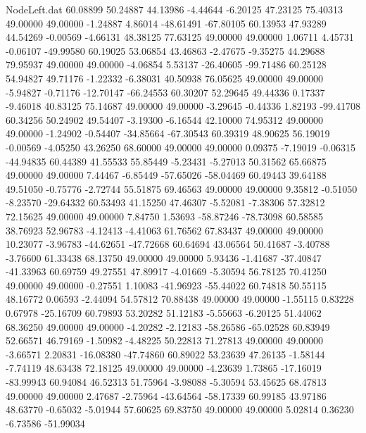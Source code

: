 \begin{filecontents}{NodeLeft.dat}
  60.08899   50.24887   44.13986    -4.44644   -6.20125   47.23125   75.40313   49.00000   49.00000   -1.24887    4.86014  -48.61491  -67.80105
  60.13953   47.93289   44.54269    -0.00569   -4.66131   48.38125   77.63125   49.00000   49.00000    1.06711    4.45731   -0.06107  -49.99580
  60.19025   53.06854   43.46863    -2.47675   -9.35275   44.29688   79.95937   49.00000   49.00000   -4.06854    5.53137  -26.40605  -99.71486
  60.25128   54.94827   49.71176    -1.22332   -6.38031   40.50938   76.05625   49.00000   49.00000   -5.94827   -0.71176  -12.70147  -66.24553
  60.30207   52.29645   49.44336     0.17337   -9.46018   40.83125   75.14687   49.00000   49.00000   -3.29645   -0.44336    1.82193  -99.41708
  60.34256   50.24902   49.54407    -3.19300   -6.16544   42.10000   74.95312   49.00000   49.00000   -1.24902   -0.54407  -34.85664  -67.30543
  60.39319   48.90625   56.19019    -0.00569   -4.05250   43.26250   68.60000   49.00000   49.00000    0.09375   -7.19019   -0.06315  -44.94835
  60.44389   41.55533   55.85449    -5.23431   -5.27013   50.31562   65.66875   49.00000   49.00000    7.44467   -6.85449  -57.65026  -58.04469
  60.49443   39.64188   49.51050    -0.75776   -2.72744   55.51875   69.46563   49.00000   49.00000    9.35812   -0.51050   -8.23570  -29.64332
  60.53493   41.15250   47.46307    -5.52081   -7.38306   57.32812   72.15625   49.00000   49.00000    7.84750    1.53693  -58.87246  -78.73098
  60.58585   38.76923   52.96783    -4.12413   -4.41063   61.76562   67.83437   49.00000   49.00000   10.23077   -3.96783  -44.62651  -47.72668
  60.64694   43.06564   50.41687    -3.40788   -3.76600   61.33438   68.13750   49.00000   49.00000    5.93436   -1.41687  -37.40847  -41.33963
  60.69759   49.27551   47.89917    -4.01669   -5.30594   56.78125   70.41250   49.00000   49.00000   -0.27551    1.10083  -41.96923  -55.44022
  60.74818   50.55115   48.16772     0.06593   -2.44094   54.57812   70.88438   49.00000   49.00000   -1.55115    0.83228    0.67978  -25.16709
  60.79893   53.20282   51.12183    -5.55663   -6.20125   51.44062   68.36250   49.00000   49.00000   -4.20282   -2.12183  -58.26586  -65.02528
  60.83949   52.66571   46.79169    -1.50982   -4.48225   50.22813   71.27813   49.00000   49.00000   -3.66571    2.20831  -16.08380  -47.74860
  60.89022   53.23639   47.26135    -1.58144   -7.74119   48.63438   72.18125   49.00000   49.00000   -4.23639    1.73865  -17.16019  -83.99943
  60.94084   46.52313   51.75964    -3.98088   -5.30594   53.45625   68.47813   49.00000   49.00000    2.47687   -2.75964  -43.64564  -58.17339
  60.99185   43.97186   48.63770    -0.65032   -5.01944   57.60625   69.83750   49.00000   49.00000    5.02814    0.36230   -6.73586  -51.99034

\end{filecontents}
